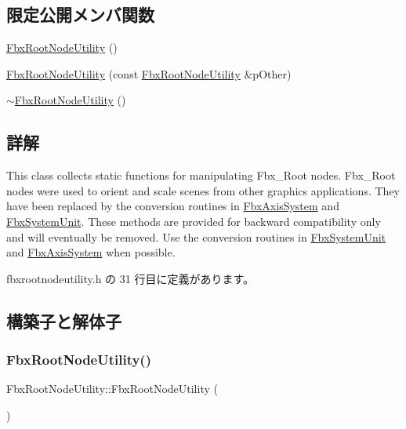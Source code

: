 \subsection*{限定公開メンバ関数}
\begin{DoxyCompactItemize}
\item 
\hyperlink{class_fbx_root_node_utility_ad52fd3ddafdce95307b3037d4ded1c4b}{Fbx\+Root\+Node\+Utility} ()
\item 
\hyperlink{class_fbx_root_node_utility_ac3919124c7800d71e61349e438e6fee1}{Fbx\+Root\+Node\+Utility} (const \hyperlink{class_fbx_root_node_utility}{Fbx\+Root\+Node\+Utility} \&p\+Other)
\item 
\hyperlink{class_fbx_root_node_utility_ada6ff546189064e1b87cd2ec6b6843a7}{$\sim$\+Fbx\+Root\+Node\+Utility} ()
\end{DoxyCompactItemize}


\subsection{詳解}
This class collects static functions for manipulating Fbx\+\_\+\+Root nodes. Fbx\+\_\+\+Root nodes were used to orient and scale scenes from other graphics applications. They have been replaced by the conversion routines in \hyperlink{class_fbx_axis_system}{Fbx\+Axis\+System} and \hyperlink{class_fbx_system_unit}{Fbx\+System\+Unit}. These methods are provided for backward compatibility only and will eventually be removed. Use the conversion routines in \hyperlink{class_fbx_system_unit}{Fbx\+System\+Unit} and \hyperlink{class_fbx_axis_system}{Fbx\+Axis\+System} when possible. 

 fbxrootnodeutility.\+h の 31 行目に定義があります。



\subsection{構築子と解体子}
\mbox{\label{class_fbx_root_node_utility_ad52fd3ddafdce95307b3037d4ded1c4b}} 
\subsubsection{\texorpdfstring{Fbx\+Root\+Node\+Utility()}{FbxRootNodeUtility()}\hspace{0.1cm}{\footnotesize\ttfamily [1/2]}}
{\footnotesize\ttfamily Fbx\+Root\+Node\+Utility\+::\+Fbx\+Root\+Node\+Utility (\begin{DoxyParamCaption}{ }\end{DoxyParamCaption})\hspace{0.3cm}{\ttfamily [protected]}}

